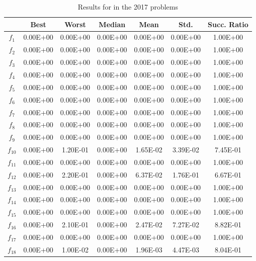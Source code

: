 \begin{table}[t]
\begin{scriptsize}
\centering
\caption{Results for \DEEDM{} in the \CEC{} 2017 problems}
\label{tab:Results_CEC2017}
\begin{tabular}{|c|c|c|c|c|c|c|}
\hline
 & \textbf{Best} & \textbf{Worst} & \textbf{Median} & \textbf{Mean} & \textbf{Std.} & \textbf{Succ. Ratio} \\ \hline
$f_1$ & 0.00E+00 & 0.00E+00 & 0.00E+00 & 0.00E+00 & 0.00E+00 & 1.00E+00 \\ \hline
$f_2$ & 0.00E+00 & 0.00E+00 & 0.00E+00 & 0.00E+00 & 0.00E+00 & 1.00E+00 \\ \hline
$f_3$ & 0.00E+00 & 0.00E+00 & 0.00E+00 & 0.00E+00 & 0.00E+00 & 1.00E+00 \\ \hline
$f_4$ & 0.00E+00 & 0.00E+00 & 0.00E+00 & 0.00E+00 & 0.00E+00 & 1.00E+00 \\ \hline
$f_5$ & 0.00E+00 & 0.00E+00 & 0.00E+00 & 0.00E+00 & 0.00E+00 & 1.00E+00 \\ \hline
$f_6$ & 0.00E+00 & 0.00E+00 & 0.00E+00 & 0.00E+00 & 0.00E+00 & 1.00E+00 \\ \hline
$f_7$ & 0.00E+00 & 0.00E+00 & 0.00E+00 & 0.00E+00 & 0.00E+00 & 1.00E+00 \\ \hline
$f_8$ & 0.00E+00 & 0.00E+00 & 0.00E+00 & 0.00E+00 & 0.00E+00 & 1.00E+00 \\ \hline
$f_9$ & 0.00E+00 & 0.00E+00 & 0.00E+00 & 0.00E+00 & 0.00E+00 & 1.00E+00 \\ \hline
$f_{10}$ & 0.00E+00 & 1.20E-01 & 0.00E+00 & 1.65E-02 & 3.39E-02 & 7.45E-01 \\ \hline
$f_{11}$ & 0.00E+00 & 0.00E+00 & 0.00E+00 & 0.00E+00 & 0.00E+00 & 1.00E+00 \\ \hline
$f_{12}$ & 0.00E+00 & 2.20E-01 & 0.00E+00 & 6.37E-02 & 1.76E-01 & 6.67E-01 \\ \hline
$f_{13}$ & 0.00E+00 & 0.00E+00 & 0.00E+00 & 0.00E+00 & 0.00E+00 & 1.00E+00 \\ \hline
$f_{14}$ & 0.00E+00 & 0.00E+00 & 0.00E+00 & 0.00E+00 & 0.00E+00 & 1.00E+00 \\ \hline
$f_{15}$ & 0.00E+00 & 0.00E+00 & 0.00E+00 & 0.00E+00 & 0.00E+00 & 1.00E+00 \\ \hline
$f_{16}$ & 0.00E+00 & 2.10E-01 & 0.00E+00 & 2.47E-02 & 7.27E-02 & 8.82E-01 \\ \hline
$f_{17}$ & 0.00E+00 & 0.00E+00 & 0.00E+00 & 0.00E+00 & 0.00E+00 & 1.00E+00 \\ \hline
$f_{18}$ & 0.00E+00 & 1.00E-02 & 0.00E+00 & 1.96E-03 & 4.47E-03 & 8.04E-01 \\ \hline

\end{tabular}
\end{scriptsize}
\end{table}
